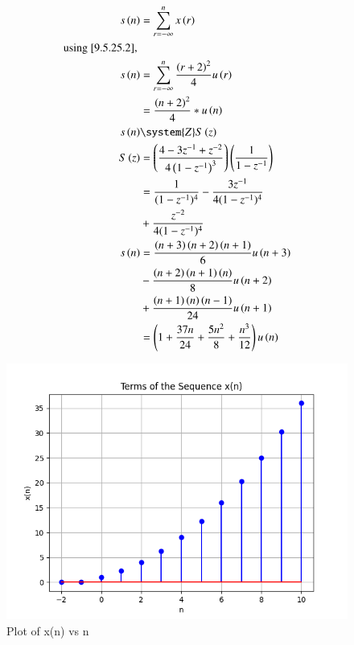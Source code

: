 \documentclass[journal,12pt,twocolumn]{article}
\begin{document}
\begin{align}
    s\brak{n} & = \sum_{r=-\infty}^{n} x\brak{r}\\
    \notag \text{using \eqref{9.5.25.2}, } \\
    s\brak{n} & = \sum_{r=-\infty}^{n} \frac{\brak{r+2}^{2}}{4} u\brak{r} \\
    & = \frac{\brak{n+2}^2}{4} * u\brak{n}\\
    s\brak{n} & \system{Z} S\brak{z}\\
    S\brak{z} & = \brak{\frac{4 -3z^{-1} + z^{-2}}{4\brak{1-z^{-1}}^3}} \brak{\frac{1}{1-z^{-1}}}\\
    & = \frac{1}{(1 - z^{-1})^4} - \frac{3z^{-1}}{4(1 - z^{-1})^4} \\
    & + \frac{z^{-2}}{4(1 - z^{-1})^4}\\
    s\brak{n} & = \frac{\brak{n + 3} \brak{n + 2}\brak{n+1}}{6}u\brak{n+3}\\
    & - \frac{\brak{n + 2} \brak{n + 1}\brak{n}}{8}u\brak{n+2}\notag\\
    & + \frac{\brak{n + 1} \brak{n}\brak{n-1}}{24}u\brak{n+1}\\
    & = \brak{1 + \frac{37n}{24} + \frac{5n^2}{8} + \frac{n^3}{12}} u\brak{n} 
\end{align}

\begin{figure}[h]
   \centering
   \includegraphics[width=1\columnwidth]{figs/plot.png}
   \caption{Plot of x(n) vs n}
   \label {fig: 11.9.5.25.1}
\end{figure}
\end{document}
